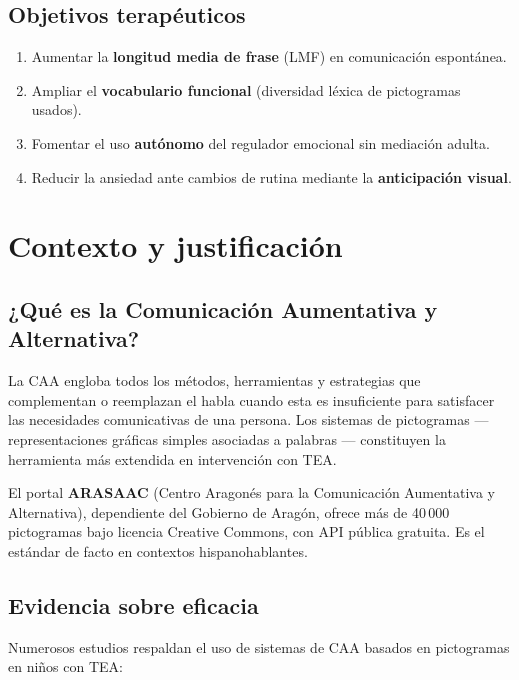 \documentclass[12pt, a4paper]{article}
\begin{document}
\subsection{Objetivos terapéuticos}

\begin{enumerate}
  \item Aumentar la \textbf{longitud media de frase} (LMF) en comunicación espontánea.
  \item Ampliar el \textbf{vocabulario funcional} (diversidad léxica de pictogramas usados).
  \item Fomentar el uso \textbf{autónomo} del regulador emocional sin mediación adulta.
  \item Reducir la ansiedad ante cambios de rutina mediante la \textbf{anticipación visual}.
\end{enumerate}

\section{Contexto y justificación}

\subsection{¿Qué es la Comunicación Aumentativa y Alternativa?}

La CAA engloba todos los métodos, herramientas y estrategias que complementan o reemplazan el habla cuando esta es insuficiente para satisfacer las necesidades comunicativas de una persona. Los sistemas de pictogramas --- representaciones gráficas simples asociadas a palabras --- constituyen la herramienta más extendida en intervención con TEA.

El portal \textbf{ARASAAC} (Centro Aragonés para la Comunicación Aumentativa y Alternativa), dependiente del Gobierno de Aragón, ofrece más de 40\,000 pictogramas bajo licencia Creative Commons, con API pública gratuita. Es el estándar de facto en contextos hispanohablantes.

\subsection{Evidencia sobre eficacia}

Numerosos estudios respaldan el uso de sistemas de CAA basados en pictogramas en niños con TEA:
\end{document}
